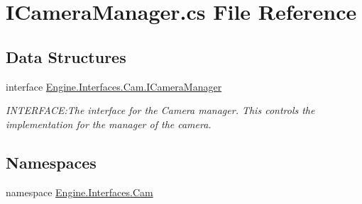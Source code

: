 \hypertarget{a00098}{}\section{I\+Camera\+Manager.\+cs File Reference}
\label{a00098}
\subsection*{Data Structures}
\begin{DoxyCompactItemize}
\item 
interface \hyperlink{a00422}{Engine.\+Interfaces.\+Cam.\+I\+Camera\+Manager}
\begin{DoxyCompactList}\small\item\em I\+N\+T\+E\+R\+F\+A\+CE\+:The interface for the Camera manager. This controls the implementation for the manager of the camera. \end{DoxyCompactList}\end{DoxyCompactItemize}
\subsection*{Namespaces}
\begin{DoxyCompactItemize}
\item 
namespace \hyperlink{a00254}{Engine.\+Interfaces.\+Cam}
\end{DoxyCompactItemize}
